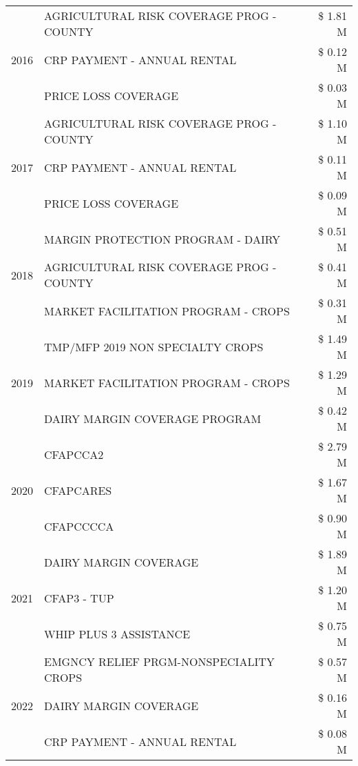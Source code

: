 \begin{tabular}{llr}
\cline{1-3}
\multirow[t]{3}{*}{2016} & AGRICULTURAL RISK COVERAGE PROG - COUNTY & \$ 1.81 M \\
 & CRP PAYMENT - ANNUAL RENTAL & \$ 0.12 M \\
 & PRICE LOSS COVERAGE & \$ 0.03 M \\
\cline{1-3}
\multirow[t]{3}{*}{2017} & AGRICULTURAL RISK COVERAGE PROG - COUNTY & \$ 1.10 M \\
 & CRP PAYMENT - ANNUAL RENTAL & \$ 0.11 M \\
 & PRICE LOSS COVERAGE & \$ 0.09 M \\
\cline{1-3}
\multirow[t]{3}{*}{2018} & MARGIN PROTECTION PROGRAM - DAIRY & \$ 0.51 M \\
 & AGRICULTURAL RISK COVERAGE PROG - COUNTY & \$ 0.41 M \\
 & MARKET FACILITATION PROGRAM - CROPS & \$ 0.31 M \\
\cline{1-3}
\multirow[t]{3}{*}{2019} & TMP/MFP 2019 NON SPECIALTY CROPS & \$ 1.49 M \\
 & MARKET FACILITATION PROGRAM - CROPS & \$ 1.29 M \\
 & DAIRY MARGIN COVERAGE PROGRAM & \$ 0.42 M \\
\cline{1-3}
\multirow[t]{3}{*}{2020} & CFAPCCA2 & \$ 2.79 M \\
 & CFAPCARES & \$ 1.67 M \\
 & CFAPCCCCA & \$ 0.90 M \\
\cline{1-3}
\multirow[t]{3}{*}{2021} & DAIRY MARGIN COVERAGE & \$ 1.89 M \\
 & CFAP3 - TUP & \$ 1.20 M \\
 & WHIP PLUS 3 ASSISTANCE & \$ 0.75 M \\
\cline{1-3}
\multirow[t]{3}{*}{2022} & EMGNCY RELIEF PRGM-NONSPECIALITY CROPS & \$ 0.57 M \\
 & DAIRY MARGIN COVERAGE & \$ 0.16 M \\
 & CRP PAYMENT - ANNUAL RENTAL & \$ 0.08 M \\
\cline{1-3}
\bottomrule
\end{tabular}
